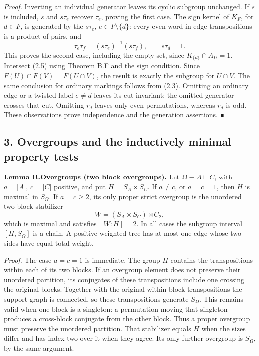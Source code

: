 \documentclass[
  11pt,
  a4paper,
]{article}
\begin{document}
\emph{Proof.} Inverting an individual generator leaves its cyclic
subgroup unchanged. If \(s\) is included, \(s\) and \(s\tau_e\) recover
\(\tau_e\), proving the first case. The sign kernel of \(K_F\), for
\(d\in F\), is generated by the \(s\tau_e\), \(e\in F\setminus\{d\}\):
every even word in edge transpositions is a product of pairs, and \[
\tau_e\tau_f=(s\tau_e)^{-1}(s\tau_f),\qquad s\tau_d=1.
\] This proves the second case, including the empty set, since
\(K_{\{d\}}\cap A_\Omega=1\). Intersect (2.5) using Theorem B.F and the
sign condition. Since \(F(U)\cap F(V)=F(U\cap V)\), the result is
exactly the subgroup for \(U\cap V\). The same conclusion for ordinary
markings follows from (2.3). Omitting an ordinary edge or a twisted
label \(e\ne d\) leaves its cut invariant; the omitted generator crosses
that cut. Omitting \(r_d\) leaves only even permutations, whereas
\(r_d\) is odd. These observations prove independence and the generation
assertions. ∎

\subsection{3. Overgroups and the inductively minimal property
tests}\label{overgroups-and-the-inductively-minimal-property-tests}

\textbf{Lemma B.Overgroups (two-block overgroups).} Let
\(\Omega=A\sqcup C\), with \(a=|A|\), \(c=|C|\) positive, and put
\(H=S_A\times S_C\). If \(a\ne c\), or \(a=c=1\), then \(H\) is maximal
in \(S_\Omega\). If \(a=c\geq2\), its only proper strict overgroup is
the unordered two-block stabilizer \[
W=(S_A\times S_C)\rtimes C_2,
\] which is maximal and satisfies \([W:H]=2\). In all cases the subgroup
interval \([H,S_\Omega]\) is a chain. A positive weighted tree has at
most one edge whose two sides have equal total weight.

\emph{Proof.} The case \(a=c=1\) is immediate. The group \(H\) contains
the transpositions within each of its two blocks. If an overgroup
element does not preserve their unordered partition, its conjugates of
these transpositions include one crossing the original blocks. Together
with the original within-block transpositions the support graph is
connected, so these transpositions generate \(S_\Omega\). This remains
valid when one block is a singleton: a permutation moving that singleton
produces a cross-block conjugate from the other block. Thus a proper
overgroup must preserve the unordered partition. That stabilizer equals
\(H\) when the sizes differ and has index two over it when they agree.
Its only further overgroup is \(S_\Omega\), by the same argument.
\end{document}
